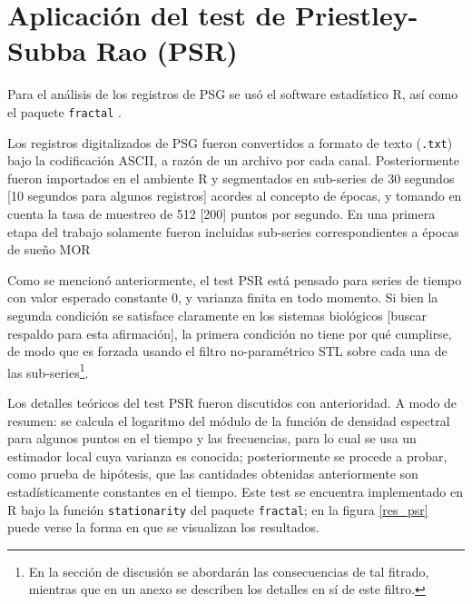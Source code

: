 
\section{Aplicaci\'on del test de Priestley-Subba Rao (PSR)}

Para el an\'alisis de los registros de PSG se us\'o el software estad\'istico R\cite{R_citar}, 
as\'i como el paquete \texttt{fractal} \cite{R_fractal}.

Los registros digitalizados de PSG fueron convertidos a formato de texto (\texttt{.txt}) bajo
la codificaci\'on ASCII, a raz\'on de un archivo por cada canal. Posteriormente fueron importados
en el ambiente R y segmentados en sub-series de 30 segundos [10 segundos para algunos 
registros] acordes al concepto de \'epocas, y tomando en cuenta la tasa de muestreo de 512 [200]
puntos por segundo. 
En una primera etapa del trabajo solamente fueron incluidas sub-series correspondientes a
\'epocas de sue\~no MOR

Como se mencion\'o anteriormente, el test PSR est\'a pensado para
series de tiempo con valor esperado constante 0, y varianza finita en todo momento. Si bien la 
segunda condici\'on se satisface claramente en los sistemas biol\'ogicos [buscar respaldo
para esta afirmaci\'on], la primera condici\'on no tiene por qu\'e cumplirse, de modo que es 
forzada
usando el filtro no-param\'etrico STL\cite{Cleveland1990} sobre cada una de las 
sub-series\footnote{En la secci\'on de discusi\'on se abordar\'an las consecuencias de tal fitrado,
mientras que en un anexo se describen los detalles en s\'i de este filtro.}.


Los detalles te\'oricos del test PSR fueron discutidos con anterioridad. A modo
de resumen: se calcula el logaritmo del m\'odulo de la funci\'on de densidad
espectral para algunos puntos en el tiempo y las frecuencias, para lo cual se usa un estimador
local cuya varianza es conocida; posteriormente se procede a probar, como prueba de
hip\'otesis, que las cantidades obtenidas anteriormente son estad\'isticamente constantes
en el tiempo.
Este test se encuentra implementado en R bajo la funci\'on \texttt{stationarity}
del paquete \texttt{fractal}; en la figura \ref{res_psr} puede verse la forma en que se
visualizan los resultados.


